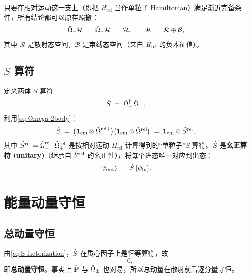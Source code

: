 只要在相对运动这一支上（即把 $H_{\text{rel}}$ 当作单粒子 Hamiltonian）满足渐近完备条件，所有结论都可以原样照搬：
\begin{equation}
  \hat{\Omega}_{+}\mathcal{H} \;=\; \hat{\Omega}_{-}\mathcal{H} \;=\; \mathcal{R}, \qquad
  \mathcal{H} \;=\; \mathcal{R}\oplus \mathcal{B},
  \label{eq:asymptotic-completeness-2p}
\end{equation}
其中 $\mathcal{R}$ 是散射态空间，$\mathcal{B}$ 是束缚态空间（来自 $H_{\text{rel}}$ 的负本征值）。

\subsection{$S$ 算符}

定义两体 $S$ 算符
\begin{equation}
  \hat{S} \;=\; \hat{\Omega}_{-}^{\dagger}\,\hat{\Omega}_{+}.
  \label{eq:S-2body}
\end{equation}
利用\eqref{eq:Omega-2body}：
\begin{equation}
  \hat{S} \;=\; \big(\mathbf{1}_{\text{cm}}\otimes\hat{\Omega}_{-}^{\text{rel}\,\dagger}\big)
              \big(\mathbf{1}_{\text{cm}}\otimes\hat{\Omega}_{+}^{\text{rel}}\big)
       \;=\; \mathbf{1}_{\text{cm}} \otimes \hat{S}^{\text{rel}},
  \label{eq:S-factorization}
\end{equation}
其中 $\hat{S}^{\text{rel}}=\hat{\Omega}_{-}^{\text{rel}\,\dagger}\hat{\Omega}_{+}^{\text{rel}}$ 是按相对运动 $H_{\text{rel}}$ 计算得到的“单粒子”$S$ 算符。$\hat{S}$ 是\textbf{幺正算符 (unitary)}（继承自 $\hat{S}^{\text{rel}}$ 的幺正性），将每个进态唯一对应到出态：
\begin{equation}
  |\psi_{\text{out}}\rangle \;=\; \hat{S}\,|\psi_{\text{in}}\rangle.
  \label{eq:S-mapping}
\end{equation}

\section{能量动量守恒}

\subsection{总动量守恒}

由\eqref{eq:S-factorization}，$\hat{S}$ 在质心因子上是恒等算符，故
\begin{equation}
  [\Smat,\bar{\bm{P}}]=0,
  \label{eq:S-Pbar-commute}
\end{equation}
即\textbf{总动量守恒}。事实上 $\bar{\bm{P}}$ 与 $\hat{\Omega}_{\pm}$ 也对易，所以总动量在散射前后逐分量守恒。

